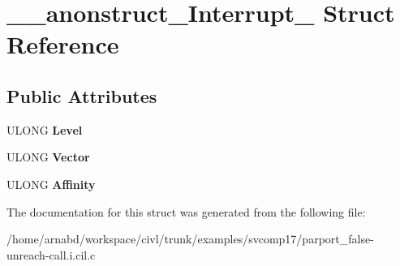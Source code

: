 \hypertarget{struct____anonstruct__Interrupt__18}{}\section{\+\_\+\+\_\+anonstruct\+\_\+\+Interrupt\+\_ Struct Reference}
\label{struct____anonstruct__Interrupt__18}
\subsection*{Public Attributes}
\begin{DoxyCompactItemize}
\item 
\hypertarget{struct____anonstruct__Interrupt__18_a167c22318eb2dd06f7ac1e1f0787a331}{}U\+L\+O\+N\+G {\bfseries Level}\label{struct____anonstruct__Interrupt__18_a167c22318eb2dd06f7ac1e1f0787a331}

\item 
\hypertarget{struct____anonstruct__Interrupt__18_a6af40a15b55973d92f7a9a4bf0d62092}{}U\+L\+O\+N\+G {\bfseries Vector}\label{struct____anonstruct__Interrupt__18_a6af40a15b55973d92f7a9a4bf0d62092}

\item 
\hypertarget{struct____anonstruct__Interrupt__18_a4671dd537420fa575487e34cdd17aedc}{}U\+L\+O\+N\+G {\bfseries Affinity}\label{struct____anonstruct__Interrupt__18_a4671dd537420fa575487e34cdd17aedc}

\end{DoxyCompactItemize}


The documentation for this struct was generated from the following file\+:\begin{DoxyCompactItemize}
\item 
/home/arnabd/workspace/civl/trunk/examples/svcomp17/parport\+\_\+false-\/unreach-\/call.\+i.\+cil.\+c\end{DoxyCompactItemize}
